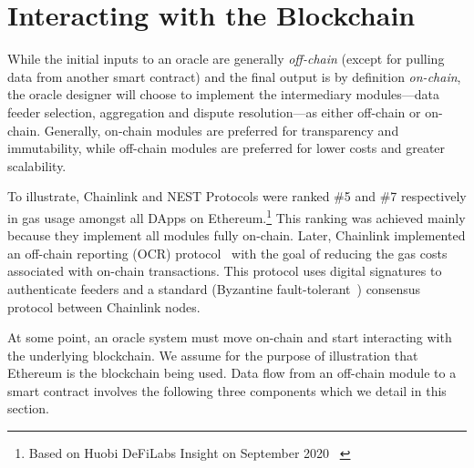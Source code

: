 
\section{Interacting with the Blockchain}\label{Interoperability}

While the initial inputs to an oracle are generally \textit{off-chain} (except for pulling data from another smart contract) and the final output is by definition \textit{on-chain}, the oracle designer will choose to implement the intermediary modules---data feeder selection, aggregation and dispute resolution---as either off-chain or on-chain. Generally, on-chain modules are preferred for transparency and immutability, while off-chain modules are preferred for lower costs and greater scalability. 

To illustrate, Chainlink and NEST Protocols were ranked \#5 and \#7 respectively in gas usage amongst all DApps on Ethereum.\footnote{Based on Huobi DeFiLabs Insight on September 2020 ~\cite{huobiDeFiLabs}} This ranking was achieved mainly because they implement all modules fully on-chain. Later, Chainlink implemented an off-chain reporting (OCR) protocol~\cite{chainlinkocr} with the goal of reducing the gas costs associated with on-chain transactions. This protocol uses digital signatures to authenticate feeders and a standard (\eg Byzantine fault-tolerant~\cite{castro2002practical}) consensus protocol between Chainlink nodes.

At some point, an oracle system must move on-chain and start interacting with the underlying blockchain. We assume for the purpose of illustration that Ethereum is the blockchain being used. Data flow from an off-chain module to a smart contract involves the following three components which we detail in this section. 

